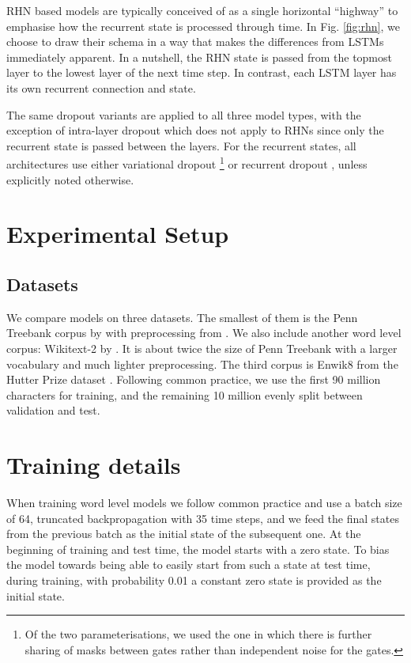 \documentclass[letter]{article} \usepackage{iclr2018_conference,times}
\newcommand{\ptb}{Penn Treebank\xspace}
\newcommand{\wikitexttwo}{Wikitext-2\xspace}
\newcommand{\enwik}{Enwik8\xspace}
\begin{document}
RHN based models are typically conceived of as a single horizontal ``highway''
to emphasise how the recurrent state is processed through time. In
Fig. \ref{fig:rhn}, we choose to draw their schema in a way that makes
the differences from LSTMs immediately apparent. In a nutshell, the
RHN state is passed from the topmost layer to the lowest layer of the
next time step. In contrast, each LSTM layer has its own recurrent
connection and state.

The same dropout variants are applied to all three model types, with
the exception of intra-layer dropout which does not apply to RHNs
since only the recurrent state is passed between the layers. For the
recurrent states, all architectures use either variational dropout
\citep[\emph{state dropout}]{gal2016theoretically}\footnote{Of the two parameterisations, we used the one in
  which there is further sharing of masks between gates rather than
  independent noise for the gates.} or recurrent dropout
\citep{DBLP:journals/corr/SemeniutaSB16}, unless explicitly noted otherwise.

\section{Experimental Setup}

\subsection{Datasets}

We compare models on three datasets. The smallest of them is the \ptb
corpus by \citet{marcus1993building} with preprocessing from
\citet{mikolov2010recurrent}. We also include another word level
corpus: \wikitexttwo by \citet{DBLP:journals/corr/MerityXBS16}. It is
about twice the size of \ptb with a larger vocabulary and much lighter
preprocessing. The third corpus is \enwik from the Hutter Prize
dataset \citep{hutter2012}. Following common practice, we use the first
90 million characters for training, and the remaining 10 million
evenly split between validation and test.

\section{Training details}

When training word level models we follow common practice and use a
batch size of 64, truncated backpropagation with 35 time steps, and we
feed the final states from the previous batch as the initial state of
the subsequent one. At the beginning of training and test time, the
model starts with a zero state. To bias the model towards being able
to easily start from such a state at test time, during training, with
probability 0.01 a constant zero state is provided as the initial
state.
\end{document}
